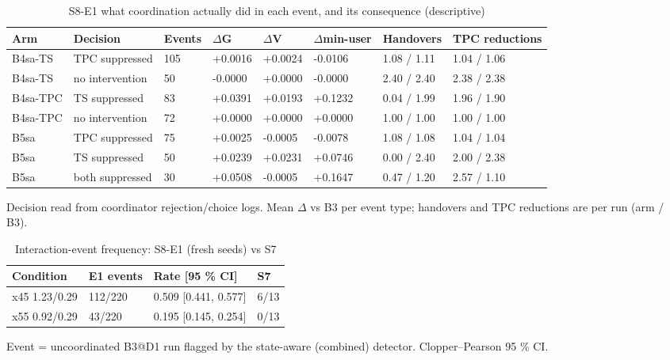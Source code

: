 \begin{table}[t]\centering\caption{S8-E1 what coordination actually did in each event, and its consequence (descriptive)}\label{tab:t6}\footnotesize
\begin{tabular}{llllllll}\toprule
Arm & Decision & Events & $\Delta$G & $\Delta$V & $\Delta$min-user & Handovers & TPC reductions \\\midrule
B4sa-TS & TPC suppressed & 105 & +0.0016 & +0.0024 & -0.0106 & 1.08 / 1.11 & 1.04 / 1.06 \\
B4sa-TS & no intervention & 50 & -0.0000 & +0.0000 & -0.0000 & 2.40 / 2.40 & 2.38 / 2.38 \\
B4sa-TPC & TS suppressed & 83 & +0.0391 & +0.0193 & +0.1232 & 0.04 / 1.99 & 1.96 / 1.90 \\
B4sa-TPC & no intervention & 72 & +0.0000 & +0.0000 & +0.0000 & 1.00 / 1.00 & 1.00 / 1.00 \\
B5sa & TPC suppressed & 75 & +0.0025 & -0.0005 & -0.0078 & 1.08 / 1.08 & 1.04 / 1.04 \\
B5sa & TS suppressed & 50 & +0.0239 & +0.0231 & +0.0746 & 0.00 / 2.40 & 2.00 / 2.38 \\
B5sa & both suppressed & 30 & +0.0508 & -0.0005 & +0.1647 & 0.47 / 1.20 & 2.57 / 1.10 \\
\bottomrule\end{tabular}
\par\smallskip\parbox{\linewidth}{\scriptsize Decision read from coordinator rejection/choice logs. Mean $\Delta$ vs B3 per event type; handovers and TPC reductions are per run (arm / B3).}\end{table}

\begin{table}[t]\centering\caption{Interaction-event frequency: S8-E1 (fresh seeds) vs S7}\label{tab:t7}\footnotesize
\begin{tabular}{llll}\toprule
Condition & E1 events & Rate [95 \% CI] & S7 \\\midrule
x45 1.23/0.29 & 112/220 & 0.509 [0.441, 0.577] & 6/13 \\
x55 0.92/0.29 & 43/220 & 0.195 [0.145, 0.254] & 0/13 \\
\bottomrule\end{tabular}
\par\smallskip\parbox{\linewidth}{\scriptsize Event = uncoordinated B3@D1 run flagged by the state-aware (combined) detector. Clopper–Pearson 95 \% CI.}\end{table}

